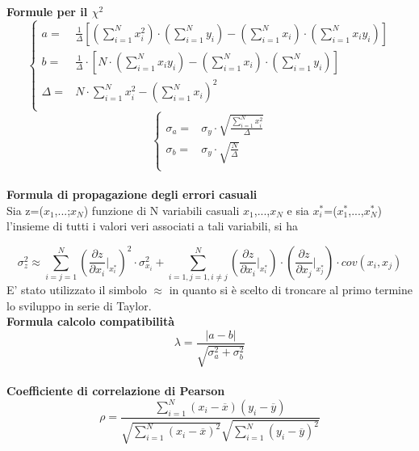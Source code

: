 \documentclass[a4paper,11pt,oneside]{article}
\begin{document}
\textbf{Formule per il ${\chi}^2$}
\begin{equation*}
        \begin{cases}
    a=&\frac{1}{\Delta}[(\sum\limits_{i=1}^{N}{x_{i}^{2}})\cdot(\sum\limits_{i=1}^{N}{y_{i}})-(\sum\limits_{i=1}^{N}{x_{i}})\cdot(\sum\limits_{i=1}^{N}{x_{i}y_{i}})] \\ 
    b=&\frac{1}{\Delta }\cdot \left [N\cdot \left ( \sum\limits_{i=1}^{N}x_i y_i \right )-\left ( \sum\limits_{i=1}^{N}x_i \right )\cdot \left ( \sum\limits_{i=1}^{N}y_i \right )  \right ]\\
    \Delta=& N\cdot \sum\limits_{i=1}^{N} x_i^{2} - \left ( \sum\limits_{i=1}^{N}x_i \right )^{2}\\
    \end{cases}
\end{equation*}
\begin{equation*}
    \begin{cases}
    \sigma_{a}=&\sigma_{y}\cdot\sqrt{\frac{\sum_{i=1}^{N}{x_{i}^{2}}}{\Delta}} \\
    \sigma_{b}=&\sigma_y\cdot \sqrt{\frac{N}{\Delta }}\\
    \end{cases}
    \label{equation:err_chi_quadro}
\end{equation*}
\\
\textbf{Formula di propagazione degli errori casuali}\\

Sia z=($x_1$,...;$x_N$) funzione di N variabili casuali $x_1$,...,$x_N$ e sia ${x_i^\ast}$=($x_1^\ast$,...,$x_N^{\ast}$) l'insieme di tutti i valori veri associati a tali variabili, si ha 

\begin{equation*}
    \sigma_z^{2}\approx  \sum_{i=j=1}^{N}\left ( \frac{\partial z}{\partial x_i}\Big|_{x_i^{\ast}} \right )^{2}\cdot\sigma_{x_i}^{2} +\sum_{i=1,j=1,i\neq j}^{N}\left (\frac{\partial z }{\partial x_i}\Big|_{x_i^{\ast}} \right ) \cdot \left ( \frac{\partial z}{\partial x_j} \Big|_{x_j^{\ast}} \right )\cdot cov(x_i,x_j)\label{eq:prop_errori}
\end{equation*}
E' stato utilizzato il simbolo $\approx$ in quanto si è scelto di troncare al primo termine lo sviluppo in serie di Taylor.\\


\textbf{Formula calcolo compatibilità}\\
\begin{equation*}
    \lambda=\frac{\left|a-b\right|}{\sqrt{\sigma^{2}_{a}+\sigma^{2}_{b}}}
\end{equation*}\\
\textbf{Coefficiente di correlazione di Pearson}\\
\begin{equation*}
    \rho=  \frac{\sum_{i=1}^{N}(x_i - \overline{x}
    )(y_i - \overline{y})}{\sqrt{\sum_{i=1}^{N}(x_i -\overline{x})^2}\sqrt{\sum_{i=1}^{N}(y_i - \overline{y})^2}}
\end{equation*}
\end{document}
